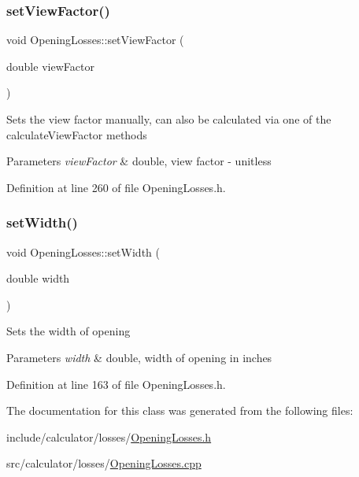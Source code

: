 \mbox{\label{class_opening_losses_a4e6c6f1549e01cd4b82b7505e403d643}} 
\subsubsection{\texorpdfstring{set\+View\+Factor()}{setViewFactor()}}
{\footnotesize\ttfamily void Opening\+Losses\+::set\+View\+Factor (\begin{DoxyParamCaption}\item[{double}]{view\+Factor }\end{DoxyParamCaption})\hspace{0.3cm}{\ttfamily [inline]}}

Sets the view factor manually, can also be calculated via one of the calculate\+View\+Factor methods 
\begin{DoxyParams}{Parameters}
{\em view\+Factor} & double, view factor -\/ unitless \\
\hline
\end{DoxyParams}


Definition at line 260 of file Opening\+Losses.\+h.

\mbox{\label{class_opening_losses_a5ee8c514917c16ecd2c63caecc98e1c6}} 
\subsubsection{\texorpdfstring{set\+Width()}{setWidth()}}
{\footnotesize\ttfamily void Opening\+Losses\+::set\+Width (\begin{DoxyParamCaption}\item[{double}]{width }\end{DoxyParamCaption})\hspace{0.3cm}{\ttfamily [inline]}}

Sets the width of opening 
\begin{DoxyParams}{Parameters}
{\em width} & double, width of opening in inches \\
\hline
\end{DoxyParams}


Definition at line 163 of file Opening\+Losses.\+h.



The documentation for this class was generated from the following files\+:\begin{DoxyCompactItemize}
\item 
include/calculator/losses/\hyperlink{_opening_losses_8h}{Opening\+Losses.\+h}\item 
src/calculator/losses/\hyperlink{_opening_losses_8cpp}{Opening\+Losses.\+cpp}\end{DoxyCompactItemize}
